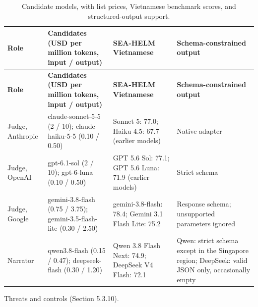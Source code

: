 {\small
\begin{longtable}{|>{\raggedright\arraybackslash}p{}|>{\raggedright\arraybackslash}p{}|>{\raggedright\arraybackslash}p{}|>{\raggedright\arraybackslash}p{}|}
\caption{Candidate models, with list prices, Vietnamese benchmark scores, and structured-\allowbreak{}output support.} \\
\hline
\textbf{Role} & \textbf{Candidates (USD per million tokens, input / output)} & \textbf{SEA-HELM Vietnamese} & \textbf{Schema-\allowbreak{}constrained output} \\ \hline
\endfirsthead
\hline
\textbf{Role} & \textbf{Candidates (USD per million tokens, input / output)} & \textbf{SEA-HELM Vietnamese} & \textbf{Schema-\allowbreak{}constrained output} \\ \hline
\endhead
Judge, Anthropic & claude-\allowbreak{}sonnet-\allowbreak{}5-\allowbreak{}5 (2 / 10); claude-\allowbreak{}haiku-\allowbreak{}5-\allowbreak{}5 (0.10 / 0.50) & Sonnet 5: 77.0; Haiku 4.5: 67.7 (earlier models) & Native adapter\cite{r195} \\ \hline
Judge, OpenAI & gpt-6.1-sol (2 / 10); gpt-6-luna (0.10 / 0.50) & GPT 5.6 Sol: 77.1; GPT 5.6 Luna: 71.9 (earlier models) & Strict schema \\ \hline
Judge, Google & gemini-\allowbreak{}3.\allowbreak{}8-\allowbreak{}flash (0.75 / 3.75); gemini-\allowbreak{}3.\allowbreak{}5-\allowbreak{}flash-\allowbreak{}lite (0.30 / 2.50) & gemini-\allowbreak{}3.\allowbreak{}8-\allowbreak{}flash: 78.4; Gemini 3.1 Flash Lite: 75.2 & Response schema; unsupported parameters ignored\cite{r196} \\ \hline
Narrator & qwen3.\allowbreak{}8-\allowbreak{}flash (0.15 / 0.47); deepseek-\allowbreak{}flash (0.30 / 1.20) & Qwen 3.8 Flash Next: 74.9; DeepSeek V4 Flash: 72.1 & Qwen: strict schema except in the Singapore region\cite{r200}; DeepSeek: valid JSON only, occasionally empty\cite{r201} \\ \hline
\end{longtable}
}

Threats and controls (Section 5.3.10).

